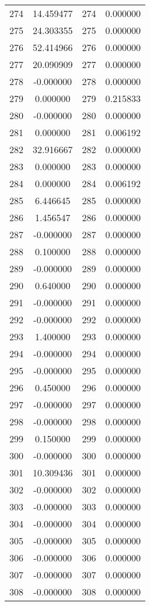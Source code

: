 \documentclass[12pt]{article}
\begin{document}
\begin{longtable}{@{}cccc@{}}
274 & 14.459477 & 274 & 0.000000 \\
275 & 24.303355 & 275 & 0.000000 \\
276 & 52.414966 & 276 & 0.000000 \\
277 & 20.090909 & 277 & 0.000000 \\
278 & -0.000000 & 278 & 0.000000 \\
279 & 0.000000 & 279 & 0.215833 \\
280 & -0.000000 & 280 & 0.000000 \\
281 & 0.000000 & 281 & 0.006192 \\
282 & 32.916667 & 282 & 0.000000 \\
283 & 0.000000 & 283 & 0.000000 \\
284 & 0.000000 & 284 & 0.006192 \\
285 & 6.446645 & 285 & 0.000000 \\
286 & 1.456547 & 286 & 0.000000 \\
287 & -0.000000 & 287 & 0.000000 \\
288 & 0.100000 & 288 & 0.000000 \\
289 & -0.000000 & 289 & 0.000000 \\
290 & 0.640000 & 290 & 0.000000 \\
291 & -0.000000 & 291 & 0.000000 \\
292 & -0.000000 & 292 & 0.000000 \\
293 & 1.400000 & 293 & 0.000000 \\
294 & -0.000000 & 294 & 0.000000 \\
295 & -0.000000 & 295 & 0.000000 \\
296 & 0.450000 & 296 & 0.000000 \\
297 & -0.000000 & 297 & 0.000000 \\
298 & -0.000000 & 298 & 0.000000 \\
299 & 0.150000 & 299 & 0.000000 \\
300 & -0.000000 & 300 & 0.000000 \\
301 & 10.309436 & 301 & 0.000000 \\
302 & -0.000000 & 302 & 0.000000 \\
303 & -0.000000 & 303 & 0.000000 \\
304 & -0.000000 & 304 & 0.000000 \\
305 & -0.000000 & 305 & 0.000000 \\
306 & -0.000000 & 306 & 0.000000 \\
307 & -0.000000 & 307 & 0.000000 \\
308 & -0.000000 & 308 & 0.000000 \\

\end{longtable}
\end{document}

